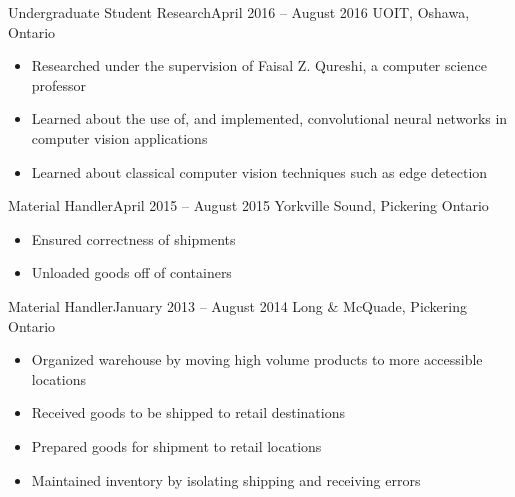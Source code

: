 \documentclass[]{article} \usepackage{lmodern} \usepackage{tabu}
\makeatletter
\newenvironment{*subsection}[2]
{
\begin{tabu} to \linewidth {@{}X[l] r}
  \textbf{#1} &
  \textbf{#2}
\end{tabu}
}
{
  \vspace{3mm}
}
\makeatother
\begin{document}
%
\begin{*subsection}{Undergraduate Student Research}{April 2016 -- August 2016}
%
UOIT, Oshawa, Ontario
%
\begin{itemize}
\item
  Researched under the supervision of Faisal Z. Qureshi, a computer
  science professor
\item
  Learned about the use of, and implemented, convolutional neural networks in computer
  vision applications
\item
  Learned about classical computer vision techniques such as edge detection
\end{itemize}
\end{*subsection}
\begin{*subsection}{Material Handler}{April 2015 -- August 2015}
%
Yorkville Sound, Pickering Ontario
%
\begin{itemize}
\item
  Ensured correctness of shipments
\item
  Unloaded goods off of containers
\end{itemize}
\end{*subsection}
\begin{*subsection}{Material Handler}{January 2013 -- August 2014}
%
Long \& McQuade, Pickering Ontario
%
\begin{itemize}
\item
  Organized warehouse by moving high volume products to more
  accessible locations
\item
  Received goods to be shipped to retail destinations
\item
  Prepared goods for shipment to retail locations
\item
  Maintained inventory by isolating shipping and receiving errors
\end{itemize}
\end{*subsection}
\end{document}
